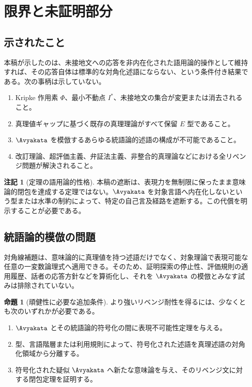 \documentclass[11pt,a4paper]{article}
\theoremstyle{definition}
\newtheorem{remark}[definition]{注記}
\theoremstyle{definition}
\newtheorem{proposition}[definition]{命題}
\newcommand{\Epoch}{E}
\begin{document}
\section{限界と未証明部分}

\subsection{示されたこと}

本稿が示したのは、未接地文への応答を非内在化された語用論的操作として維持すれば、その応答自体は標準的な対角化述語にならない、という条件付き結果である。次の事柄は示していない。

\begin{enumerate}
 \item Kripke 作用素 $\Phi$、最小不動点 $I^*$、未接地文の集合が変更または消去されること。
 \item 真理値ギャップに基づく既存の真理理論がすべて保留 $\Epoch$ 型であること。
 \item $\Avyakata$ を模倣するあらゆる統語論的述語の構成が不可能であること。
 \item 改訂理論、超評価主義、弁証法主義、非整合的真理論などにおける全リベンジ問題が解決されること。
\end{enumerate}

\begin{remark}[定理の語用論的性格]
本稿の遮断は、表現力を無制限に保ったまま意味論的閉包を達成する定理ではない。$\Avyakata$ を対象言語へ内在化しないという型または水準の制約によって、特定の自己言及経路を遮断する。この代償を明示することが必要である。
\end{remark}

\subsection{統語論的模倣の問題}

対角線補題は、意味論的に真理値を持つ述語だけでなく、対象理論で表現可能な任意の一変数論理式へ適用できる。そのため、証明探索の停止性、評価規則の適用履歴、話者の応答方針などを算術化し、それを $\Avyakata$ の模倣とみなす試みは排除されていない。

\begin{proposition}[頑健性に必要な追加条件]
より強いリベンジ耐性を得るには、少なくとも次のいずれかが必要である。
\begin{enumerate}
 \item $\Avyakata$ とその統語論的符号化の間に表現不可能性定理を与える。
 \item 型、言語階層または利用規則によって、符号化された述語を真理述語の対角化領域から分離する。
 \item 符号化された疑似 $\Avyakata$ へ新たな意味論を与え、そのリベンジ文に対する閉包定理を証明する。
\end{enumerate}
\end{proposition}
\end{document}
